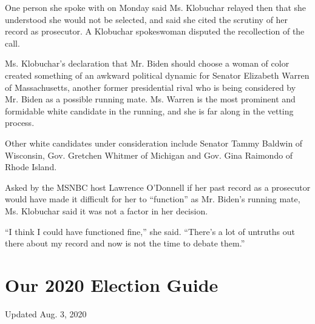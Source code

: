 One person she spoke with on Monday said Ms. Klobuchar relayed then that
she understood she would not be selected, and said she cited the
scrutiny of her record as prosecutor. A Klobuchar spokeswoman disputed
the recollection of the call.

Ms. Klobuchar's declaration that Mr. Biden should choose a woman of
color created something of an awkward political dynamic for Senator
Elizabeth Warren of Massachusetts, another former presidential rival who
is being considered by Mr. Biden as a possible running mate. Ms. Warren
is the most prominent and formidable white candidate in the running, and
she is far along in the vetting process.

Other white candidates under consideration include Senator Tammy Baldwin
of Wisconsin, Gov. Gretchen Whitmer of Michigan and Gov. Gina Raimondo
of Rhode Island.

Asked by the MSNBC host Lawrence O'Donnell if her past record as a
prosecutor would have made it difficult for her to ``function'' as Mr.
Biden's running mate, Ms. Klobuchar said it was not a factor in her
decision.

``I think I could have functioned fine,'' she said. ``There's a lot of
untruths out there about my record and now is not the time to debate
them.''

\hypertarget{our-2020-election-guide}{%
\section{Our 2020 Election Guide}\label{our-2020-election-guide}}

Updated Aug. 3, 2020

